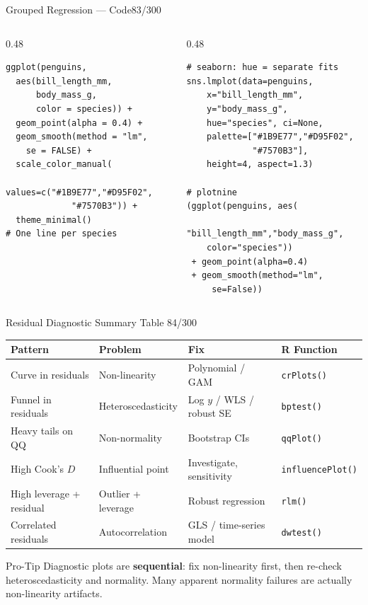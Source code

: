 \documentclass[10pt]{beamer}
\newcommand{\smark}[1]{\hfill{\scriptsize\color{codegray}#1}}
\begin{document}
\begin{frame}[fragile]{Grouped Regression --- Code}\smark{83/300}
\begin{columns}[T]
\begin{column}{0.48\textwidth}
\begin{lstlisting}[style=Rstyle]
ggplot(penguins,
  aes(bill_length_mm,
      body_mass_g,
      color = species)) +
  geom_point(alpha = 0.4) +
  geom_smooth(method = "lm",
    se = FALSE) +
  scale_color_manual(
    values=c("#1B9E77","#D95F02",
             "#7570B3")) +
  theme_minimal()
# One line per species
\end{lstlisting}
\end{column}
\begin{column}{0.48\textwidth}
\begin{lstlisting}[style=Pystyle]
# seaborn: hue = separate fits
sns.lmplot(data=penguins,
    x="bill_length_mm",
    y="body_mass_g",
    hue="species", ci=None,
    palette=["#1B9E77","#D95F02",
             "#7570B3"],
    height=4, aspect=1.3)

# plotnine
(ggplot(penguins, aes(
    "bill_length_mm","body_mass_g",
    color="species"))
 + geom_point(alpha=0.4)
 + geom_smooth(method="lm",
     se=False))
\end{lstlisting}
\end{column}
\end{columns}
\end{frame}

\begin{frame}{Residual Diagnostic Summary Table}
\smark{84/300}
\centering\small
\begin{tabular}{@{}llll@{}}
    \toprule
    \textbf{Pattern} & \textbf{Problem} & \textbf{Fix} & \textbf{R Function} \\
    \midrule
    Curve in residuals       & Non-linearity     & Polynomial / GAM        & \texttt{crPlots()} \\
    Funnel in residuals      & Heteroscedasticity& Log $y$ / WLS / robust SE& \texttt{bptest()} \\
    Heavy tails on QQ        & Non-normality     & Bootstrap CIs           & \texttt{qqPlot()} \\
    High Cook's $D$          & Influential point & Investigate, sensitivity& \texttt{influencePlot()} \\
    High leverage + residual & Outlier + leverage& Robust regression       & \texttt{rlm()} \\
    Correlated residuals     & Autocorrelation   & GLS / time-series model & \texttt{dwtest()} \\
    \bottomrule
\end{tabular}

\vspace{0.3cm}
\begin{alertblock}{Pro-Tip}
    \scriptsize Diagnostic plots are \textbf{sequential}: fix non-linearity first, then re-check heteroscedasticity and normality. Many apparent normality failures are actually non-linearity artifacts.
\end{alertblock}
\end{frame}
\end{document}
